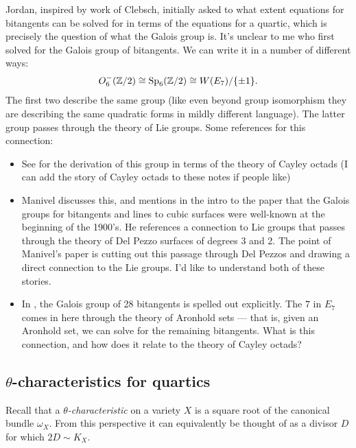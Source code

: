 \documentclass[11pt]{amsart}
\begin{document}
Jordan, inspired by work of Clebsch, initially asked to what extent equations for bitangents can be solved for in terms of the equations for a quartic, which is precisely the question of what the Galois group is. It's unclear to me who first solved for the Galois group of bitangents. We can write it in a number of different ways:
\begin{align*}
    O_6^-(\mathbb{Z}/2) \cong \mathrm{Sp}_6(\mathbb{Z}/2) \cong W(E_7)/\{\pm 1\}.
\end{align*}
The first two describe the same group (like even beyond group isomorphism they are describing the same quadratic forms in mildly different language). The latter group passes through the theory of Lie groups. Some references for this connection:
\begin{itemize}
    \item See \cite[Theorem~9]{DolgachevOrtland} for the derivation of this group in terms of the theory of Cayley octads (I can add the story of Cayley octads to these notes if people like)
    \item Manivel \cite{Manivel2006} discusses this, and mentions in the intro to the paper that the Galois groups for bitangents and lines to cubic surfaces were well-known at the beginning of the 1900's. He references a connection to Lie groups that passes through the theory of Del Pezzo surfaces of degrees 3 and 2. The point of Manivel's paper is cutting out this passage through Del Pezzos and drawing a direct connection to the Lie groups. I'd like to understand both of these stories.
    \item In \cite[p.~367]{MillerBlichfeldtDickson}, the Galois group of 28 bitangents is spelled out explicitly. The $7$ in $E_7$ comes in here through the theory of Aronhold sets --- that is, given an Aronhold set, we can solve for the remaining bitangents. What is this connection, and how does it relate to the theory of Cayley octads?
\end{itemize}

\subsection{\texorpdfstring{$\theta$}{theta}-characteristics for quartics}

Recall that a $\theta$\textit{-characteristic} on a variety $X$ is a square root of the canonical bundle $\omega_X$. From this perspective it can equivalently be thought of as a divisor $D$ for which $2D \sim K_X$.
\end{document}
